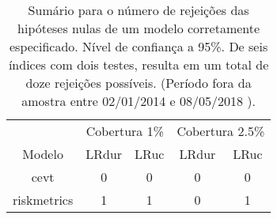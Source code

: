 \begin{table}[H]

\caption{\label{tab:}Sumário para o número de rejeições das hipóteses nulas de um modelo 
corretamente especificado. Nível de confiança a 95\%. De seis índices com 
dois testes, resulta em um total de doze rejeições possíveis. 
(Período fora da amostra entre 02/01/2014 e  08/05/2018 ).}
\centering
\begin{tabular}[t]{ccccc}
\toprule
\multicolumn{1}{c}{} & \multicolumn{2}{c}{Cobertura 1\%} & \multicolumn{2}{c}{Cobertura 2.5\%} \\
\cmidrule(l{2pt}r{2pt}){2-3} \cmidrule(l{2pt}r{2pt}){4-5}
Modelo & LRdur & LRuc & LRdur & LRuc\\
\midrule
cevt & 0 & 0 & 0 & 0\\
riskmetrics & 1 & 1 & 0 & 1\\
\bottomrule
\end{tabular}
\end{table}
